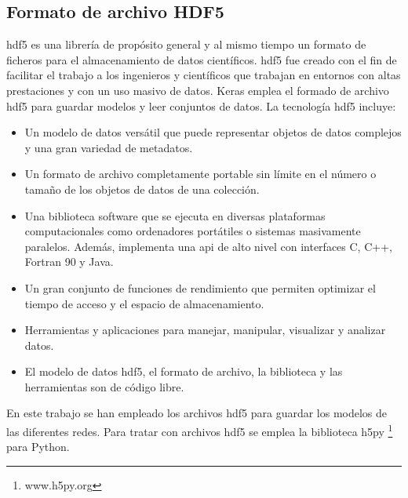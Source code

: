 \subsection{Formato de archivo HDF5}

\acrfull{hdf5} \cite{hdf5_1} \cite{hdf5_2} es una librería de propósito general y al mismo tiempo un formato de ficheros para el almacenamiento de datos científicos. \acrshort{hdf5} fue creado con el fin de facilitar el trabajo a los ingenieros y científicos que trabajan en entornos con altas prestaciones y con un uso masivo de datos. Keras emplea el formado de archivo \acrshort{hdf5} para guardar modelos y leer conjuntos de datos. La tecnología \acrshort{hdf5} incluye:

\begin{itemize}
    \item Un modelo de datos versátil que puede representar objetos de datos complejos y una gran variedad de metadatos.
    
    \item Un formato de archivo completamente portable sin límite en el número o tamaño de los objetos de datos de una colección.
    
    \item Una biblioteca software que se ejecuta en diversas plataformas computacionales como ordenadores portátiles o sistemas masivamente paralelos. Además, implementa una \acrshort{api} de alto nivel con interfaces C, C++, Fortran 90 y Java.
    
    \item Un gran conjunto de funciones de rendimiento que permiten optimizar el tiempo de acceso y el espacio de almacenamiento.
    
    \item Herramientas y aplicaciones para manejar, manipular, visualizar y analizar datos.
    
    \item El modelo de datos \acrshort{hdf5}, el formato de archivo, la biblioteca y las herramientas son de código libre.
\end{itemize}

En este trabajo se han empleado los archivos \acrshort{hdf5} para guardar los modelos de las diferentes redes. Para tratar con archivos \acrshort{hdf5} se emplea la biblioteca h5py \footnote{www.h5py.org} para Python.


